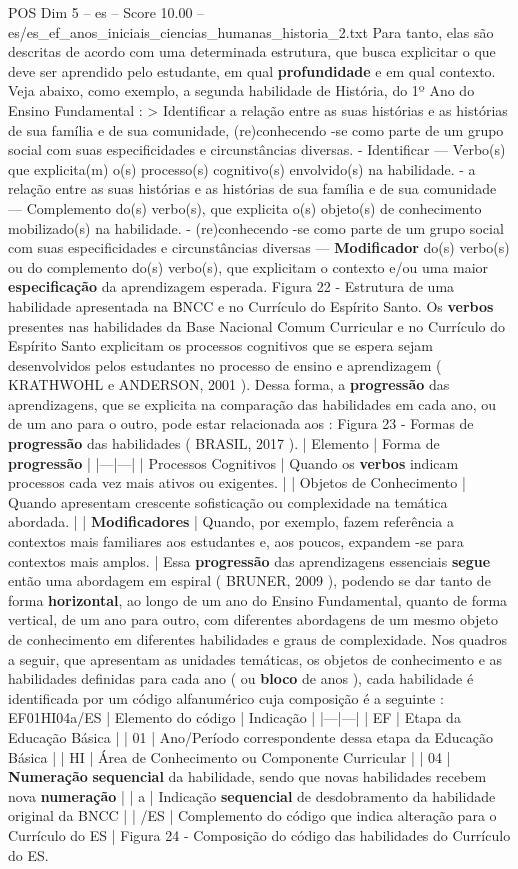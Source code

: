 \begin{textsample}{POS Dim 5 – es – Score 10.00 – es/es\_ef\_anos\_iniciais\_ciencias\_humanas\_historia\_2.txt}
Para tanto, elas são descritas de acordo com uma determinada estrutura, que busca explicitar o que deve ser aprendido pelo estudante, em qual \textbf{profundidade} e em qual contexto.
Veja abaixo, como exemplo, a segunda habilidade de História, do 1º Ano do Ensino Fundamental : > Identificar a relação entre as suas histórias e as histórias de sua família e de sua comunidade, (re)conhecendo -se como parte de um grupo social com suas especificidades e circunstâncias diversas. - Identificar — Verbo(s) que explicita(m) o(s) processo(s) cognitivo(s) envolvido(s) na habilidade. - a relação entre as suas histórias e as histórias de sua família e de sua comunidade — Complemento do(s) verbo(s), que explicita o(s) objeto(s) de conhecimento mobilizado(s) na habilidade. - (re)conhecendo -se como parte de um grupo social com suas especificidades e circunstâncias diversas — \textbf{Modificador} do(s) verbo(s) ou do complemento do(s) verbo(s), que explicitam o contexto e/ou uma maior \textbf{especificação} da aprendizagem esperada.
Figura 22 - Estrutura de uma habilidade apresentada na BNCC e no Currículo do Espírito Santo.
Os \textbf{verbos} presentes nas habilidades da Base Nacional Comum Curricular e no Currículo do Espírito Santo explicitam os processos cognitivos que se espera sejam desenvolvidos pelos estudantes no processo de ensino e aprendizagem ( KRATHWOHL e ANDERSON, 2001 ).
Dessa forma, a \textbf{progressão} das aprendizagens, que se explicita na comparação das habilidades em cada ano, ou de um ano para o outro, pode estar relacionada aos : Figura 23 - Formas de \textbf{progressão} das habilidades ( BRASIL, 2017 ). | Elemento | Forma de \textbf{progressão} | |---|---| | Processos Cognitivos | Quando os \textbf{verbos} indicam processos cada vez mais ativos ou exigentes. | | Objetos de Conhecimento | Quando apresentam crescente sofisticação ou complexidade na temática abordada. | | \textbf{Modificadores} | Quando, por exemplo, fazem referência a contextos mais familiares aos estudantes e, aos poucos, expandem -se para contextos mais amplos. | Essa \textbf{progressão} das aprendizagens essenciais \textbf{segue} então uma abordagem em espiral ( BRUNER, 2009 ), podendo se dar tanto de forma \textbf{horizontal}, ao longo de um ano do Ensino Fundamental, quanto de forma vertical, de um ano para outro, com diferentes abordagens de um mesmo objeto de conhecimento em diferentes habilidades e graus de complexidade.
Nos quadros a seguir, que apresentam as unidades temáticas, os objetos de conhecimento e as habilidades definidas para cada ano ( ou \textbf{bloco} de anos ), cada habilidade é identificada por um código alfanumérico cuja composição é a seguinte : EF01HI04a/ES | Elemento do código | Indicação | |---|---| | EF | Etapa da Educação Básica | | 01 | Ano/Período correspondente dessa etapa da Educação Básica | | HI | Área de Conhecimento ou Componente Curricular | | 04 | \textbf{Numeração} \textbf{sequencial} da habilidade, sendo que novas habilidades recebem nova \textbf{numeração} | | a | Indicação \textbf{sequencial} de desdobramento da habilidade original da BNCC | | /ES | Complemento do código que indica alteração para o Currículo do ES | Figura 24 - Composição do código das habilidades do Currículo do ES.

\end{textsample}
